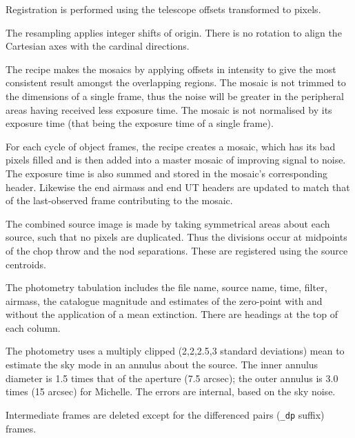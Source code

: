 \documentclass[twoside,11pt,nolof]{starlink}
\begin{document}
{{{         \sstitem
         Registration is performed using the telescope offsets
         transformed to pixels.

         \sstitem
         The resampling applies integer shifts of origin.  There is no
         rotation to align the Cartesian axes with the cardinal directions.

         \sstitem
         The recipe makes the mosaics by applying offsets in intensity
         to give the most consistent result amongst the overlapping regions.
         The mosaic is not trimmed to the dimensions of a single frame, thus
         the noise will be greater in the peripheral areas having received
         less exposure time.  The mosaic is not normalised by its exposure
         time (that being the exposure time of a single frame).

         \sstitem
         For each cycle of object frames, the recipe creates a mosaic,
         which has its bad pixels filled and is then added into a master
         mosaic of improving signal to noise.  The exposure time is also
         summed and stored in the mosaic's corresponding header.  Likewise
         the end airmass and end UT headers are updated to match that of the
         last-observed frame contributing to the mosaic.

         \sstitem
         The combined source image is made by taking symmetrical areas
         about each source, such that no pixels are duplicated.  Thus the
         divisions occur at midpoints of the chop throw and the nod
         separations.  These are registered using the source centroids.

         \sstitem
         The photometry tabulation includes the file name, source name,
         time, filter, airmass, the catalogue magnitude and estimates of
         the zero-point with and without the application of a mean
         extinction.  There are headings at the top of each column.

         \sstitem
         The photometry uses a multiply clipped (2,2,2.5,3 standard
         deviations) mean to estimate the sky mode in an annulus about the
         source.  The inner annulus diameter is 1.5 times that of the
         aperture (7.5 arcsec); the outer annulus is 3.0 times (15 arcsec)
         for Michelle.  The errors are internal, based on the sky noise.

         \sstitem
         Intermediate frames are deleted except for the differenced pairs
         ({\tt\_dp} suffix) frames.
      }
   }
   }
\end{document}
